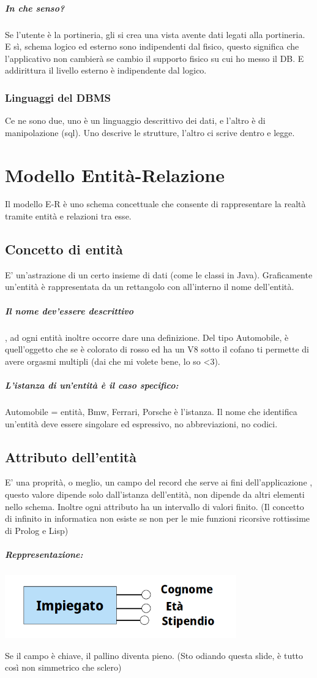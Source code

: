 \documentclass[12pt, a4paper, openany, twoside]{book}
\begin{document}
\paragraph{In che senso?} Se l'utente è la portineria, gli si crea una vista
avente dati legati alla portineria.
E sì, schema logico ed esterno sono indipendenti dal fisico, questo significa
che l'applicativo non cambierà se cambio il supporto fisico su cui ho messo il
DB. E addirittura il livello esterno è indipendente dal logico.
\subsection{Linguaggi del DBMS}
Ce ne sono due, uno è un linguaggio descrittivo dei dati, e l'altro è di 
manipolazione (sql). Uno descrive le strutture, l'altro ci scrive dentro e 
legge.
\chapter{Modello Entità-Relazione}
Il modello E-R è uno schema concettuale che consente di rappresentare la 
realtà tramite entità e relazioni tra esse.
\section{Concetto di entità}
E' un'astrazione di un certo insieme di dati (come le classi in Java). Graficamente
un'entità è rappresentata da un rettangolo con all'interno il nome dell'entità.
\paragraph{Il nome dev'essere descrittivo},
ad ogni entità inoltre occorre dare una definizione. Del tipo Automobile, è 
quell'oggetto che se è colorato di rosso ed ha un V8 sotto il cofano ti permette
di avere orgasmi multipli (dai che mi volete bene, lo so <3).
\paragraph{L'istanza di un'entità è il caso specifico:} Automobile = entità, 
Bmw, Ferrari, Porsche è l'istanza. Il nome che identifica un'entità deve essere
singolare ed espressivo, no abbreviazioni, no codici.
\section{Attributo dell'entità}
E' una proprità, o meglio, un campo del record che serve ai fini dell'applicazione
, questo valore dipende solo dall'istanza dell'entità, non dipende da altri
elementi nello schema. Inoltre ogni attributo ha un intervallo di valori finito.
(Il concetto di infinito in informatica non esiste se non per le mie funzioni
ricorsive rottissime di Prolog e Lisp) 
\paragraph{Reppresentazione:}
\begin{center}
\includegraphics[width=0.75\textwidth]{2.png}
\end{center}
Se il campo è chiave, il pallino diventa pieno. (Sto odiando questa slide, è 
tutto così non simmetrico che sclero)
\end{document}
